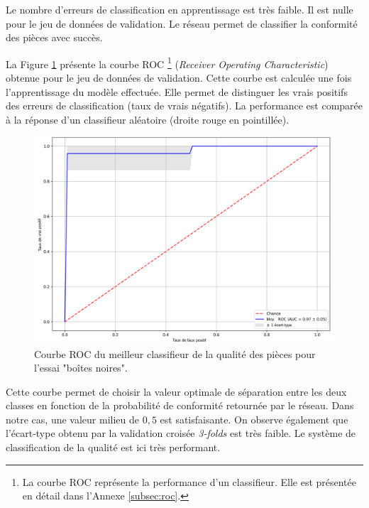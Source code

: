 Le nombre d'erreurs de classification en apprentissage est très faible.
Il est nulle pour le jeu de données de validation.
Le réseau permet de classifier la conformité des pièces avec succès.

La Figure \ref{fig:roc_result} présente la courbe ROC
\footnote{La courbe ROC représente la performance d'un classifieur. Elle est présentée en détail dans l'Annexe \ref{subsec:roc}.} (\textit{Receiver Operating Characteristic}) obtenue pour le jeu de données de validation.
Cette courbe est calculée une fois l'apprentissage du modèle effectuée.
Elle permet de distinguer les vrais positifs des erreurs de classification (taux de vrais négatifs).
La performance est comparée à la réponse d'un classifieur aléatoire (droite rouge en pointillée).

\begin{figure}[bthp]
	\centering
	\includegraphics[width=\textwidth,height=\textheight,keepaspectratio]{../Chap4/Figures/roc_images_all_224_3cams_densenet_conv4_PCA20.png}
	\caption{Courbe ROC du meilleur classifieur de la qualité des pièces pour l'essai "boîtes noires".}
	\label{fig:roc_result}
\end{figure}

Cette courbe permet de choisir la valeur optimale de séparation entre les deux classes en fonction de la probabilité de conformité retournée par le réseau.
Dans notre cas, une valeur milieu de $0,5$ est satisfaisante.
On observe également que l'écart-type obtenu par la validation croisée \textit{3-folds} est très faible.
Le système de classification de la qualité est ici très performant. 

